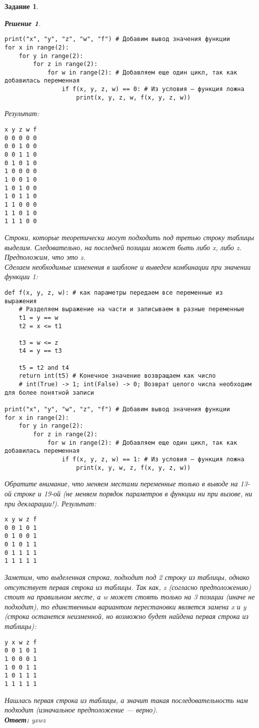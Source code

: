 \documentclass[12pt]{article}
\theoremstyle{problem_style}
\newtheorem{problem}{Задание}[subsection]
\newtheorem{solution}{Решение}[subsection]
\begin{document}
\begin{problem}
\begin{solution}
\begin{verbatim}
print("x", "y", "z", "w", "f") # Добавим вывод значения функции
for x in range(2): 
    for y in range(2):
        for z in range(2): 
            for w in range(2): # Добавляем еще один цикл, так как добавилась переменная
                if f(x, y, z, w) == 0: # Из условия — функция ложна
                    print(x, y, z, w, f(x, y, z, w))
\end{verbatim}
Результат:
\begin{verbatim}
x y z w f
0 0 0 0 0
0 0 1 0 0
0 0 1 1 0
0 1 0 1 0
1 0 0 0 0
1 0 0 1 0
1 0 1 0 0
1 0 1 1 0
1 1 0 0 0
1 1 0 1 0
1 1 1 0 0
\end{verbatim}
Строки, которые теоретически могут подходить под третью строку таблицы выделим. Следовательно, на последней позиции может быть либо x, либо z. \textit{Предположим, что это z.}\\
Сделаем необходимые изменения в шаблоне и выведем комбинации при значении функции 1:
\begin{verbatim}
def f(x, y, z, w): # как параметры передаем все переменные из выражения
    # Разделяем выражение на части и записываем в разные переменные
    t1 = y == w
    t2 = x <= t1
    
    t3 = w <= z
    t4 = y == t3
    
    t5 = t2 and t4
    return int(t5) # Конечное значение возвращаем как число
    # int(True) -> 1; int(False) -> 0; Возврат целого числа необходим для более понятной записи

print("x", "y", "w", "z", "f") # Добавим вывод значения функции
for x in range(2): 
    for y in range(2):
        for z in range(2): 
            for w in range(2): # Добавляем еще один цикл, так как добавилась переменная
                if f(x, y, z, w) == 1: # Из условия — функция ложна
                    print(x, y, w, z, f(x, y, z, w))
\end{verbatim}
Обратите внимание, что меняем местами переменные только в выводе на 13-ой строке и 19-ой (\textit{не меняем порядок параметров в функции ни при вызове, ни при декларации!}).
Результат:
\begin{verbatim}
x y w z f
0 0 1 0 1
0 1 0 0 1
0 1 0 1 1
0 1 1 1 1
1 1 1 1 1
\end{verbatim}
Заметим, что выделенная строка, подходит под 2 строку из таблицы, однако отсутствует первая строка из таблицы. Так как, z (согласно предположению) стоит на правильном месте, а w может стоять только на 3 позиции (иначе не подходит), то единственным вариантом перестановки является замена x и y (строка останется неизменной, но возможно будет найдена первая строка из таблицы):
\begin{verbatim}
y x w z f
0 0 1 0 1
1 0 0 0 1
1 0 0 1 1
1 0 1 1 1
1 1 1 1 1
\end{verbatim}
Нашлась первая строка из таблицы, а значит такая последовательность нам подходит (изначальное предположение — верно).\\
\textbf{Ответ:} yxwz
\end{solution}
\end{problem}
\end{document}
